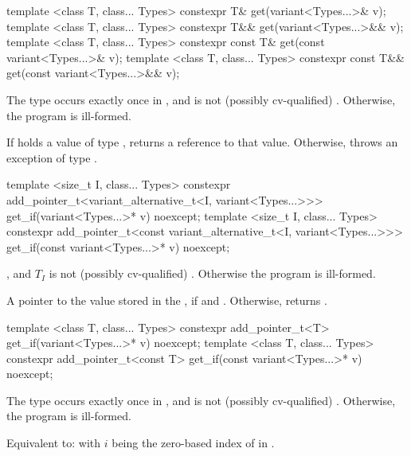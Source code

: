 %
\begin{itemdecl}
template <class T, class... Types> constexpr T& get(variant<Types...>& v);
template <class T, class... Types> constexpr T&& get(variant<Types...>&& v);
template <class T, class... Types> constexpr const T& get(const variant<Types...>& v);
template <class T, class... Types> constexpr const T&& get(const variant<Types...>&& v);
\end{itemdecl}

\begin{itemdescr}
\pnum
\requires
The type  occurs exactly once in , and  is
not (possibly cv-qualified) . Otherwise, the program is ill-formed.

\pnum
\effects
If  holds a value of type , returns a reference to that value.
Otherwise, throws an exception of type .
\end{itemdescr}

%
%
\begin{itemdecl}
template <size_t I, class... Types>
  constexpr add_pointer_t<variant_alternative_t<I, variant<Types...>>>
  get_if(variant<Types...>* v) noexcept;
template <size_t I, class... Types>
  constexpr add_pointer_t<const variant_alternative_t<I, variant<Types...>>>
  get_if(const variant<Types...>* v) noexcept;
\end{itemdecl}

\begin{itemdescr}
\pnum
\requires
{}, and $T_I$ is not (possibly cv-qualified) .
Otherwise the program is ill-formed.

\pnum
\returns
A pointer to the value stored in the , if 
and . Otherwise, returns .
\end{itemdescr}

%
%
\begin{itemdecl}
template <class T, class... Types>
  constexpr add_pointer_t<T> get_if(variant<Types...>* v) noexcept;
template <class T, class... Types>
  constexpr add_pointer_t<const T> get_if(const variant<Types...>* v) noexcept;
\end{itemdecl}

\begin{itemdescr}
\pnum
\requires
The type  occurs exactly once in , and  is
not (possibly cv-qualified) . Otherwise, the program is ill-formed.

\pnum
\effects
Equivalent to:  with $i$ being the zero-based
index of  in .
\end{itemdescr}

